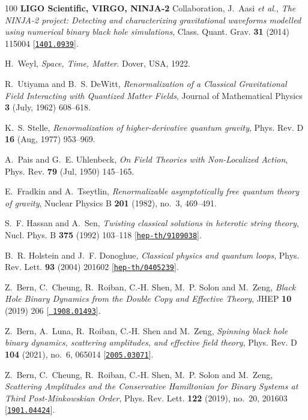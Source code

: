 \begin{thebibliography}{100}
{\bf LIGO Scientific, VIRGO, NINJA-2} Collaboration, J.~Aasi {\em et al.},
  {\em {The NINJA-2 project: Detecting and characterizing gravitational
  waveforms modelled using numerical binary black hole simulations}}, Class.
  Quant. Grav. {\bf 31} (2014) 115004
  [\href{http://www.arXiv.org/abs/1401.0939}{{\tt 1401.0939}}].

H.~Weyl, {\em Space, Time, Matter}.
\newblock Dover, USA, 1922.

R.~{Utiyama} and B.~S. {DeWitt},  {\em {Renormalization of a Classical
  Gravitational Field Interacting with Quantized Matter Fields}}, Journal of
  Mathematical Physics {\bf 3} (July, 1962) 608--618.

K.~S. Stelle,  {\em Renormalization of higher-derivative quantum gravity},
  Phys. Rev. D {\bf 16} (Aug, 1977) 953--969.

A.~Pais and G.~E. Uhlenbeck,  {\em On Field Theories with Non-Localized
  Action}, Phys. Rev. {\bf 79} (Jul, 1950) 145--165.

E.~Fradkin and A.~Tseytlin,  {\em Renormalizable asymptotically free quantum
  theory of gravity}, Nuclear Physics B {\bf 201} (1982), no.~3, 469--491.

S.~F. Hassan and A.~Sen,  {\em {Twisting classical solutions in heterotic
  string theory}}, Nucl. Phys. B {\bf 375} (1992) 103--118
  [\href{http://www.arXiv.org/abs/hep-th/9109038}{{\tt hep-th/9109038}}].

B.~R. Holstein and J.~F. Donoghue,  {\em {Classical physics and quantum
  loops}}, Phys. Rev. Lett. {\bf 93} (2004) 201602
  [\href{http://www.arXiv.org/abs/hep-th/0405239}{{\tt hep-th/0405239}}].

Z.~Bern, C.~Cheung, R.~Roiban, C.-H. Shen, M.~P. Solon and M.~Zeng,  {\em
  {Black Hole Binary Dynamics from the Double Copy and Effective Theory}}, JHEP
  {\bf 10} (2019) 206 [\href{http://www.arXiv.org/abs/1908.01493}{{\tt
  1908.01493}}].

Z.~Bern, A.~Luna, R.~Roiban, C.-H. Shen and M.~Zeng,  {\em {Spinning black hole
  binary dynamics, scattering amplitudes, and effective field theory}}, Phys.
  Rev. D {\bf 104} (2021), no.~6, 065014
  [\href{http://www.arXiv.org/abs/2005.03071}{{\tt 2005.03071}}].

Z.~Bern, C.~Cheung, R.~Roiban, C.-H. Shen, M.~P. Solon and M.~Zeng,  {\em
  {Scattering Amplitudes and the Conservative Hamiltonian for Binary Systems at
  Third Post-Minkowskian Order}}, Phys. Rev. Lett. {\bf 122} (2019), no.~20,
  201603 [\href{http://www.arXiv.org/abs/1901.04424}{{\tt 1901.04424}}].


\end{thebibliography}
